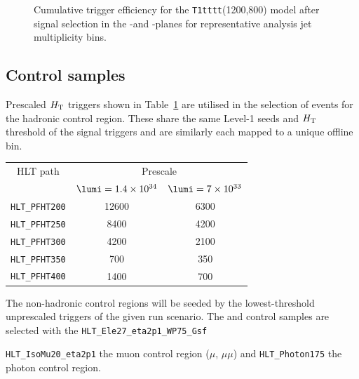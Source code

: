 \begin{figure}[h!]
\begin{center}
    \caption{
Cumulative trigger efficiency for the \texttt{T1tttt}(1200,800) model after signal selection in the \alphat-\scalht and \mht-\scalht planes for representative analysis jet multiplicity bins.}
    \label{fig:T1ttt_Trigger_Efficiency}
  \end{center} 
\end{figure}







\subsection{Control samples\label{sec:control_samples}}
Prescaled $\mbox{$H_\text{T}$}$ triggers shown in Table~\ref{tab:2015_Hadronic_Control_Triggers} are utilised in the selection of events for the hadronic control region. These share the same Level-1 seeds and $\mbox{$H_\text{T}$}$ threshold of the signal triggers and are similarly each mapped to a unique offline bin. 


\begin{table}[h!]
\footnotesize
\centering
\begin{tabular}{c|cc} 
\hline
\hline
HLT path & \multicolumn{2}{c}{Prescale} \\
         & $\lumi=1.4\times10^{34}$  & $\lumi=7\times10^{33}$     \\
\hline
\verb!HLT_PFHT200! & 12600 & 6300 \\
\verb!HLT_PFHT250! & 8400  & 4200 \\
\verb!HLT_PFHT300! & 4200  & 2100 \\
\verb!HLT_PFHT350! & 700   & 350  \\
\verb!HLT_PFHT400! & 1400  & 700  \\
\hline
\hline

\end{tabular}
\label{tab:2015_Hadronic_Control_Triggers}
\end{table}




The non-hadronic control regions will be seeded by the lowest-threshold unprescaled triggers of the given run scenario. 
The \ej and \eej control samples are selected with the  \verb!HLT_Ele27_eta2p1_WP75_Gsf! 



 \verb!HLT_IsoMu20_eta2p1! the muon control region ($\mu$, $\mu\mu$) and \verb!HLT_Photon175! the photon control region.





